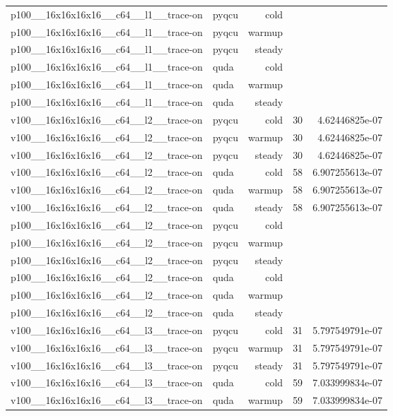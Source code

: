 \begin{table}[htbp]
\begin{tabular}{@{}llrrr@{}}
p100\_\_16x16x16x16\_\_c64\_\_l1\_\_trace-on & pyqcu & cold &  &  \\
p100\_\_16x16x16x16\_\_c64\_\_l1\_\_trace-on & pyqcu & warmup &  &  \\
p100\_\_16x16x16x16\_\_c64\_\_l1\_\_trace-on & pyqcu & steady &  &  \\
p100\_\_16x16x16x16\_\_c64\_\_l1\_\_trace-on & quda & cold &  &  \\
p100\_\_16x16x16x16\_\_c64\_\_l1\_\_trace-on & quda & warmup &  &  \\
p100\_\_16x16x16x16\_\_c64\_\_l1\_\_trace-on & quda & steady &  &  \\
v100\_\_16x16x16x16\_\_c64\_\_l2\_\_trace-on & pyqcu & cold & 30 & 4.62446825e-07 \\
v100\_\_16x16x16x16\_\_c64\_\_l2\_\_trace-on & pyqcu & warmup & 30 & 4.62446825e-07 \\
v100\_\_16x16x16x16\_\_c64\_\_l2\_\_trace-on & pyqcu & steady & 30 & 4.62446825e-07 \\
v100\_\_16x16x16x16\_\_c64\_\_l2\_\_trace-on & quda & cold & 58 & 6.907255613e-07 \\
v100\_\_16x16x16x16\_\_c64\_\_l2\_\_trace-on & quda & warmup & 58 & 6.907255613e-07 \\
v100\_\_16x16x16x16\_\_c64\_\_l2\_\_trace-on & quda & steady & 58 & 6.907255613e-07 \\
p100\_\_16x16x16x16\_\_c64\_\_l2\_\_trace-on & pyqcu & cold &  &  \\
p100\_\_16x16x16x16\_\_c64\_\_l2\_\_trace-on & pyqcu & warmup &  &  \\
p100\_\_16x16x16x16\_\_c64\_\_l2\_\_trace-on & pyqcu & steady &  &  \\
p100\_\_16x16x16x16\_\_c64\_\_l2\_\_trace-on & quda & cold &  &  \\
p100\_\_16x16x16x16\_\_c64\_\_l2\_\_trace-on & quda & warmup &  &  \\
p100\_\_16x16x16x16\_\_c64\_\_l2\_\_trace-on & quda & steady &  &  \\
v100\_\_16x16x16x16\_\_c64\_\_l3\_\_trace-on & pyqcu & cold & 31 & 5.797549791e-07 \\
v100\_\_16x16x16x16\_\_c64\_\_l3\_\_trace-on & pyqcu & warmup & 31 & 5.797549791e-07 \\
v100\_\_16x16x16x16\_\_c64\_\_l3\_\_trace-on & pyqcu & steady & 31 & 5.797549791e-07 \\
v100\_\_16x16x16x16\_\_c64\_\_l3\_\_trace-on & quda & cold & 59 & 7.033999834e-07 \\
v100\_\_16x16x16x16\_\_c64\_\_l3\_\_trace-on & quda & warmup & 59 & 7.033999834e-07 \\

\end{tabular}
\end{table}

